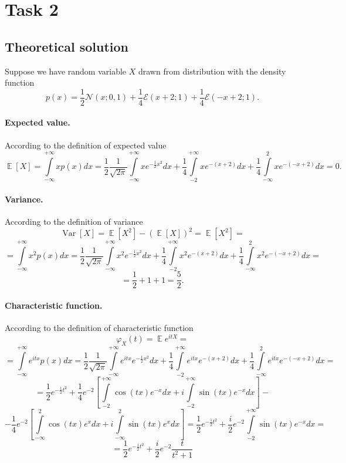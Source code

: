 \documentclass[a4paper, 12pt]{article}
\DeclareMathOperator*{\E}{\mathbb{E}}
\DeclareMathOperator*{\Var}{\text{Var}}
\begin{document}
\section{Task 2}
\subsection{Theoretical solution}
Suppose we have random variable $X$ drawn from distribution with the density function 
\begin{equation}
\label{eq2_1}
p(x) = \dfrac{1}{2} \mathcal{N}(x; 0, 1) + \dfrac{1}{4} \mathcal{E}(x+2; 1) + \dfrac{1}{4} \mathcal{E}(-x+2; 1).
\end{equation}
\paragraph{Expected value.} According to the definition of expected value
$$
\E [X] = \int \limits_{- \infty}^{+\infty} x p(x) dx = \dfrac{1}{2} \dfrac{1}{\sqrt{2 \pi}} \int \limits_{-\infty}^{+\infty} xe^{-\frac{1}{2}x^2} dx + \dfrac{1}{4} \int \limits_{-2}^{+\infty} xe^{-(x+2)} dx + \dfrac{1}{4} \int \limits_{-\infty}^{2} xe^{-(-x+2)} dx = 0.
$$
\paragraph{Variance.} According to the definition of variance
$$
\Var [X] = \E [X^2] - (\E [X])^2 = \E[X^2] = 
$$
$$
= \int \limits_{- \infty}^{+\infty} x^2 p(x) dx = \dfrac{1}{2} \dfrac{1}{\sqrt{2 \pi}} \int \limits_{-\infty}^{+\infty} x^2e^{-\frac{1}{2}x^2} dx + \dfrac{1}{4} \int \limits_{-2}^{+\infty} x^2e^{-(x+2)} dx + \dfrac{1}{4} \int \limits_{-\infty}^{2} x^2e^{-(-x+2)} dx =
$$
$$
= \dfrac{1}{2} + 1 + 1 = \dfrac{5}{2}.
$$
\paragraph{Characteristic function.}
According to the definition of characteristic function
$$
\varphi_X(t) = \E e^{itX} = 
$$
$$
= \int \limits_{- \infty}^{+\infty} e^{itx} p(x) dx = \dfrac{1}{2} \dfrac{1}{\sqrt{2 \pi}} \int \limits_{-\infty}^{+\infty} e^{itx} e^{-\frac{1}{2}x^2} dx + \dfrac{1}{4} \int \limits_{-2}^{+\infty} e^{itx} e^{-(x+2)} dx + \dfrac{1}{4} \int \limits_{-\infty}^{2} e^{itx} e^{-(-x+2)} dx = 
$$
$$
= \dfrac{1}{2} e^{-\frac{1}{2}t^2} + \dfrac{1}{4} e^{-2} \left[ \int \limits_{-2}^{+\infty} \cos(tx) e^{-x}dx + i\int \limits_{-2}^{+\infty} \sin(tx) e^{-x}dx \right] - 
$$
$$
- \dfrac{1}{4} e^{-2} \left[ \int \limits_{-\infty}^{2} \cos(tx) e^{x}dx + i\int \limits_{-\infty}^{2} \sin(tx) e^{x}dx \right] = 
\dfrac{1}{2} e^{-\frac{1}{2}t^2} + \dfrac{i}{2} e^{-2} \int \limits_{-2}^{+\infty} \sin(tx) e^{-x}dx =
$$
$$
= \dfrac{1}{2} e^{-\frac{1}{2}t^2} + \dfrac{i}{2} e^{-2} \dfrac{t}{t^2 + 1}
$$
\end{document}
